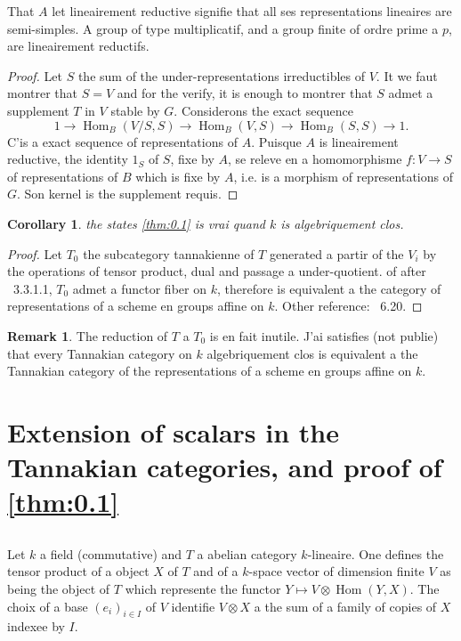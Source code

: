 \documentclass[11pt,a4paper]{article}
\theoremstyle{plain}
\newtheorem{corollary}[theorem]{Corollary}
\theoremstyle{definition}
\newtheorem{remark}[theorem]{Remark}
\DeclareMathOperator{\Hom}{Hom}
\begin{document}
That $A$ let lineairement reductive signifie that all ses representations lineaires are semi-simples. A group of type multiplicatif, and a group finite of ordre prime a $p$, are lineairement reductifs.

\begin{proof}
Let $S$ the sum of the under-representations irreductibles of $V$. It we faut montrer that $S = V$ and for the verify, it is enough to montrer that $S$ admet a supplement $T$ in $V$ stable by $G$. Considerons the exact sequence
\[
1 \longrightarrow \Hom_B(V/S, S) \longrightarrow \Hom_B(V, S) \longrightarrow \Hom_B(S, S) \longrightarrow 1.
\]
C'is a exact sequence of representations of $A$. Puisque $A$ is lineairement reductive, the identity $1_S$ of $S$, fixe by $A$, se releve en a homomorphisme $f: V \to S$ of representations of $B$ which is fixe by $A$, i.e. is a morphism of representations of $G$. Son kernel is the supplement requis.
\end{proof}

\begin{corollary}\label{cor:3.3}
the states \ref{thm:0.1} is vrai quand $k$ is algebriquement clos.
\end{corollary}

\begin{proof}
Let $T_0$ the subcategory tannakienne of $T$ generated a partir of the $V_i$ by the operations of tensor product, dual and passage a under-quotient. of after \cite{Saavedra}~3.3.1.1, $T_0$ admet a functor fiber on $k$, therefore is equivalent a the category of representations of a scheme en groups affine on $k$. Other reference: \cite{Deligne1990}~6.20.
\end{proof}

\begin{remark}\label{rem:3.4}
The reduction of $T$ a $T_0$ is en fait inutile. J'ai satisfies (not publie) that every Tannakian category on $k$ algebriquement clos is equivalent a the Tannakian category of the representations of a scheme en groups affine on $k$.
\end{remark}

\section{Extension of scalars in the Tannakian categories, and proof of \ref{thm:0.1}}\label{sec:4}

\subsection{}
Let $k$ a field (commutative) and $T$ a abelian category $k$-lineaire. One defines the tensor product of a object $X$ of $T$ and of a $k$-space vector of dimension finite $V$ as being the object of $T$ which represente the functor $Y \mapsto V \otimes \Hom(Y, X)$. The choix of a base $(e_i)_{i \in I}$ of $V$ identifie $V \otimes X$ a the sum of a family of copies of $X$ indexee by $I$.
\end{document}
